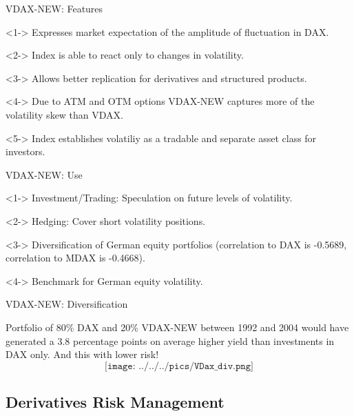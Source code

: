 


{VDAX-NEW: Features}






	<1-> Expresses market expectation of the amplitude of fluctuation in DAX.


	<2-> Index is able to react only to changes in volatility.


	<3-> Allows better replication for derivatives and structured products.


	<4-> Due to ATM and OTM options VDAX-NEW captures more of the volatility skew than VDAX.


	<5-> Index establishes volatiliy as a tradable and separate asset class for investors.





{VDAX-NEW: Use}






	<1-> Investment/Trading: Speculation on future levels of volatility.


	<2-> Hedging: Cover short volatility positions.


	<3-> Diversification of German equity portfolios (correlation to DAX is -0.5689, correlation to MDAX is -0.4668).


	<4-> Benchmark for German equity volatility.





{VDAX-NEW: Diversification}






	Portfolio of 80\% DAX and 20\% VDAX-NEW between
1992 and 2004 would have generated a 3.8 percentage
points on average higher yield than investments in
DAX only. And this with lower risk!
$$\texttt{[image: ../../../pics/VDax\_div.png]}$$





\subsection{Derivatives Risk Management}


